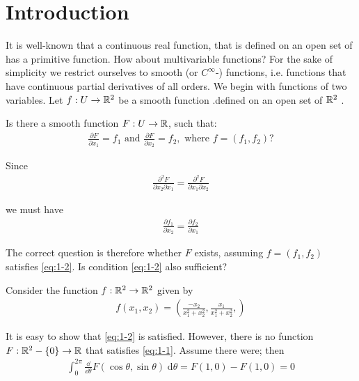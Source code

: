 \chapter{Introduction}
It is well-known that a continuous real function, that is defined on an open set of
\RR{} has a primitive function. How about multivariable functions? For the sake of
simplicity we restrict ourselves to smooth (or $C^\infty$-) functions, i.e. functions that
have continuous partial derivatives of all orders.
We begin with functions of two variables. Let $f:U\to {\ensuremath{\mathbb{R}}}^2$ be a smooth function
.defined on an open set of ${\mathbb{R}}^2$ .

\begin{question}\label{question:1-1}
Is there a smooth function $F:U\to {\ensuremath{\mathbb{R}}}$, such that:
\begin{align}
  \frac{\partial F }{\partial x_1 } = f_1 \text{ and }
  \frac{\partial F }{\partial x_2 } = f_2, \text{ where } 
  f = (f_1, f_2)?
  \label{eq:1-1}
\end{align}

Since
\begin{align*}
  \frac{\partial ^2 F }{\partial x_2\partial x_1 } = 
  \frac{\partial ^2 F }{\partial x_1\partial x_2 }
\end{align*}

we must have 
\begin{align}
  \frac{\partial f_1 }{\partial x_2 } = \frac{\partial f_2 }{\partial x_1}
  \label{eq:1-2}
\end{align}

The correct question is therefore whether $F$ exists, assuming $f = (f_1, f_2)$ satisfies
\eqref{eq:1-2}. Is condition \eqref{eq:1-2} also sufficient?
\end{question}


\begin{example}\label{example:1-2}
Consider the function $f:{\mathbb{R}}^2 \to {\ensuremath{\mathbb{R}}}^2$ given by
\begin{align*}
  f(x_1, x_2) = \left(\frac{-x_2}{x_1^2 +x_2^2}, \frac{x_1}{x_1^2 +x_2^2},\right)
\end{align*}
\end{example}

It is easy to show that \eqref{eq:1-2} is satisfied. However, there is no function $F:{\mathbb{R}}^2-\{0\}\to {\ensuremath{\mathbb{R}}}$
that satisfies \eqref{eq:1-1}. Assume there were; then
\begin{align*}
  \int_{0}^{2\pi}{\frac{\dd }{\dd\theta} F(\cos\theta, \sin\theta)\;\mathrm{d}\theta}
  = F(1, 0) - F(1, 0) = 0
\end{align*}

